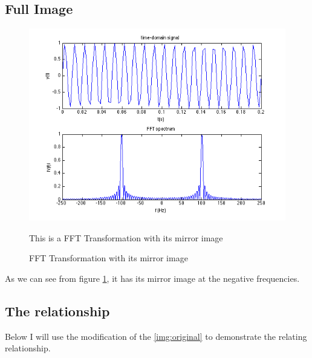 \documentclass[11pt]{article}
\begin{document}
\subsection{Full Image}
\begin{figure}[h!]
\includegraphics[scale=0.75]{ELEC_2.png}
\caption{FFT Transformation with its mirror image}

\label{img:full}
\begin{minipage}{0.75\textwidth}
{\footnotesize This is a FFT Transformation with its mirror image}
\end{minipage}
\end{figure}
\FloatBarrier
 
As we can see from figure \ref{img:full}, it has its mirror image at the negative frequencies.

\subsection{The relationship}

Below I will use the modification of the \ref{img:original} to demonstrate the relating relationship.
\end{document}
